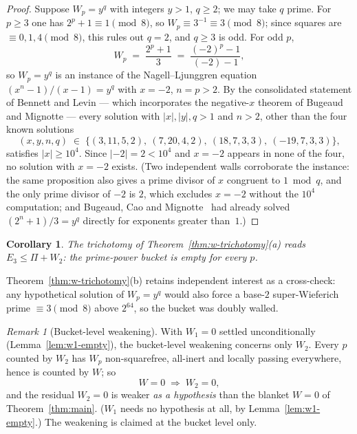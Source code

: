 \documentclass[11pt]{amsart}
\theoremstyle{plain}
\newtheorem{corollary}[theorem]{Corollary}
\theoremstyle{definition}
\theoremstyle{remark}
\newtheorem{remark}[theorem]{Remark}
\numberwithin{equation}{section}
\begin{document}
\begin{proof}
Suppose $W_p = y^q$ with integers $y > 1$, $q \geq 2$; we may take $q$ prime. For $p \geq 3$ one has $2^p + 1 \equiv 1 \pmod 8$, so $W_p \equiv 3^{-1} \equiv 3 \pmod 8$; since squares are $\equiv 0, 1, 4 \pmod 8$, this rules out $q = 2$, and $q \geq 3$ is odd. For odd $p$,
\[
  W_p \;=\; \frac{2^p + 1}{3} \;=\; \frac{(-2)^p - 1}{(-2) - 1},
\]
so $W_p = y^q$ is an instance of the Nagell--Ljunggren equation $(x^n - 1)/(x - 1) = y^q$ with $x = -2$, $n = p > 2$. By the consolidated statement of Bennett and Levin \cite[Proposition~1]{ref:BennettLevin} --- which incorporates the negative-$x$ theorem of Bugeaud and Mignotte \cite{ref:BugeaudMignotte2002} --- every solution with $|x|, |y|, q > 1$ and $n > 2$, other than the four known solutions
\[
  (x, y, n, q) \;\in\; \{(3, 11, 5, 2),\ (7, 20, 4, 2),\ (18, 7, 3, 3),\ (-19, 7, 3, 3)\},
\]
satisfies $|x| \geq 10^4$. Since $|{-2}| = 2 < 10^4$ and $x = -2$ appears in none of the four, no solution with $x = -2$ exists. (Two independent walls corroborate the instance: the same proposition also gives a prime divisor of $x$ congruent to $1 \bmod q$, and the only prime divisor of $-2$ is $2$, which excludes $x = -2$ without the $10^4$ computation; and Bugeaud, Cao and Mignotte~\cite{ref:BugeaudCaoMignotte2001} had already solved $(2^n + 1)/3 = y^q$ directly for exponents greater than~$1$.)
\end{proof}

\begin{corollary}\label{cor:w1-zero}
The trichotomy of Theorem~\ref{thm:w-trichotomy}(a) reads $E_3 \leq \Pi + W_2$: the prime-power bucket is empty for every $p$.
\end{corollary}

Theorem~\ref{thm:w-trichotomy}(b) retains independent interest as a cross-check: any hypothetical solution of $W_p = y^q$ would also force a base-$2$ super-Wieferich prime $\equiv 3 \pmod 8$ above $2^{64}$, so the bucket was doubly walled.

\begin{remark}[Bucket-level weakening]\label{rem:bucket-weakening}
With $W_1 = 0$ settled unconditionally (Lemma~\ref{lem:w1-empty}), the bucket-level weakening concerns only $W_2$. Every $p$ counted by $W_2$ has $W_p$ non-squarefree, all-inert and locally passing everywhere, hence is counted by $W$; so
\[
  W = 0 \;\Longrightarrow\; W_2 = 0,
\]
and the residual $W_2 = 0$ is weaker \emph{as a hypothesis} than the blanket $W = 0$ of Theorem~\ref{thm:main}. ($W_1$ needs no hypothesis at all, by Lemma~\ref{lem:w1-empty}.) The weakening is claimed at the bucket level only.
\end{remark}
\end{document}
